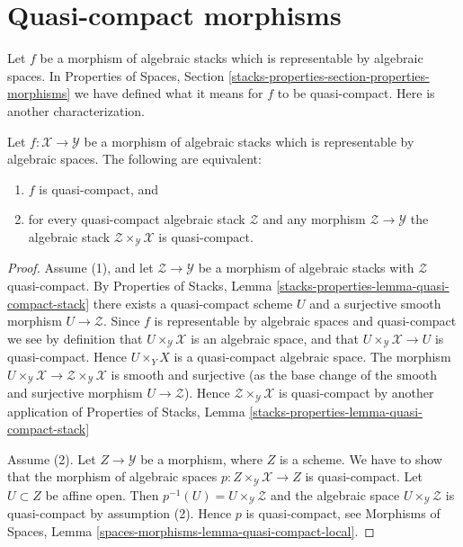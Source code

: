 \section{Quasi-compact morphisms}
\label{section-quasi-compact}

\noindent
Let $f$ be a morphism of algebraic stacks which is representable by
algebraic spaces. In
Properties of Spaces,
Section \ref{stacks-properties-section-properties-morphisms}
we have defined what it means for $f$ to be quasi-compact.
Here is another characterization.

\begin{lemma}
\label{lemma-characterize-representable-quasi-compact}
Let $f : \mathcal{X} \to \mathcal{Y}$ be a morphism of algebraic stacks
which is representable by algebraic spaces. The following are equivalent:
\begin{enumerate}
\item $f$ is quasi-compact, and
\item for every quasi-compact algebraic stack $\mathcal{Z}$
and any morphism $\mathcal{Z} \to \mathcal{Y}$ the algebraic stack
$\mathcal{Z} \times_\mathcal{Y} \mathcal{X}$ is quasi-compact.
\end{enumerate}
\end{lemma}

\begin{proof}
Assume (1), and let $\mathcal{Z} \to \mathcal{Y}$
be a morphism of algebraic stacks with $\mathcal{Z}$ quasi-compact. By
Properties of Stacks,
Lemma \ref{stacks-properties-lemma-quasi-compact-stack}
there exists a quasi-compact scheme $U$ and a surjective smooth
morphism $U \to \mathcal{Z}$. Since $f$ is representable by algebraic
spaces and quasi-compact we see by definition that
$U \times_\mathcal{Y} \mathcal{X}$ is an algebraic space, and that
$U \times_\mathcal{Y} \mathcal{X} \to U$ is quasi-compact.
Hence $U \times_Y X$ is a quasi-compact algebraic space.
The morphism
$U \times_\mathcal{Y} \mathcal{X} \to
\mathcal{Z} \times_\mathcal{Y} \mathcal{X}$
is smooth and surjective (as the base change of the smooth
and surjective morphism $U \to \mathcal{Z}$).
Hence $\mathcal{Z} \times_\mathcal{Y} \mathcal{X}$
is quasi-compact by another application of
Properties of Stacks,
Lemma \ref{stacks-properties-lemma-quasi-compact-stack}

\medskip\noindent
Assume (2). Let $Z \to \mathcal{Y}$ be a morphism, where $Z$ is a scheme.
We have to show that the morphism of algebraic spaces
$p : Z \times_\mathcal{Y} \mathcal{X} \to Z$ is quasi-compact.
Let $U \subset Z$ be affine open. Then
$p^{-1}(U) = U \times_\mathcal{Y} \mathcal{Z}$
and the algebraic space $U \times_\mathcal{Y} \mathcal{Z}$
is quasi-compact by assumption (2). Hence $p$ is quasi-compact, see
Morphisms of Spaces, Lemma \ref{spaces-morphisms-lemma-quasi-compact-local}.
\end{proof}

